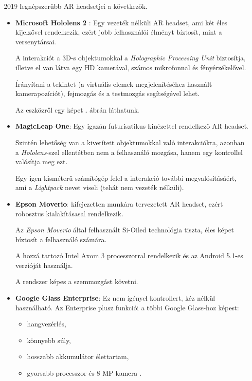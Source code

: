 2019 legnépszerűbb AR headsetjei a következők.
\begin{itemize}
\item {\bf Microsoft Hololens 2} \cite{kalantari2018exploring}: Egy vezeték nélküli AR headset, ami két éles kijelzővel rendelkezik, ezért jobb felhasználói élményt bíztosít, mint a versenytársai.

A interakciót a 3D-s objektumokkal a \textit{Holographic Processing Unit} biztosítja, illetve el van látva egy HD kamerával, számos mikrofonnal és fényérzékelővel.

Írányítani a tekintet (a virtuális elemek megjelenítéséhez használt kamerapozíciót), fejmozgás és a testmozgás segítségével lehet.

Az eszközről egy képet . ábrán láthatunk.

\item {\bf MagicLeap One}: Egy igazán futurisztikus kinézettel rendelkező AR headset.

Szintén lehetőség van a kivetített objektumokkal való interakciókra, azonban a \textit{Hololens}-szel ellentétben nem a felhasználó mozgása, hanem egy kontrollel valósítja meg ezt. 

Egy igen kisméterű számítógép felel a interakció további megvalósításáért, ami a \textit{Lightpack} nevet viseli (tehát nem vezeték nélküli).
  
\item {\bf Epson Moverio}: kifejezetten munkára tervezetett AR headset, ezért robosztus kialakításasal rendelkezik.

Az \textit{Epson Moverio} által felhasznált Si-Oiled technológia tiszta, éles képet bíztosít a felhasználó számára.

A hozzá tartozó Intel Axom 3 processzorral rendelkezik és az Android 5.1-es verzióját használja. 

A rendszer képes a szemmozgást követni.

\item {\bf Google Glass Enterprise}: Ez nem igényel kontrollert, kéz nélkül használható.
Az Enterprise plusz funkciói a többi Google Glass-hoz képest:
\begin{itemize}
\item hangvezérlés,
\item könnyebb súly,
\item hosszabb akkumulátor élettartam,
\item gyorsabb processzor és 8 MP kamera \cite{arhardware}.
\end{itemize}
\end{itemize}

